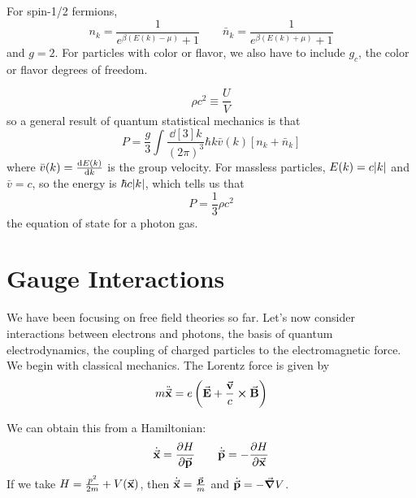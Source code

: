 \documentclass[a4paper,twoside,master.tex]{subfiles}
\begin{document}
For spin-1/2 fermions,
\begin{equation}
    n_k = \frac{1}{e^{\beta (E(k) - \mu)} + 1} \qquad \bar{n}_k = \frac{1}{e^{\beta (E(k) + \mu)} + 1}
\end{equation}
and $ g = 2 $. For particles with color or flavor, we also have to include $ g_c $, the color or flavor degrees of freedom.

\begin{equation}
    \rho c^2 \equiv \frac{U}{V}
\end{equation}
so a general result of quantum statistical mechanics is that
\begin{equation}
    P = \frac{g}{3} \int \frac{\dd[3]{k}}{(2 \pi)^3} \hbar k \bar{v}(k) [n_k + \bar{n}_k]
\end{equation}
where $ \bar{v}(k) = \dv{E(k)}{k} $ is the group velocity. For massless particles, $ E(k) = c \abs{k} $ and $ \bar{v} = c $, so the energy is $ \hbar c \abs{k} $, which tells us that
\begin{equation}
    P = \frac{1}{3} \rho c^2
\end{equation}
the equation of state for a photon gas.


\section{Gauge Interactions}\label{sec:gauge_interactions}

We have been focusing on free field theories so far. Let's now consider interactions between electrons and photons, the basis of quantum electrodynamics, the coupling of charged particles to the electromagnetic force. We begin with classical mechanics. The Lorentz force is given by
\begin{equation}
    m \ddot{\va{x}} = e \left( \va{E} + \frac{\va{v}}{c} \cross \va{B} \right)
\end{equation}

We can obtain this from a Hamiltonian:
\begin{equation}
    \dot{\va{x}} = \pdv{H}{\va{p}} \qquad \dot{\va{p}} = - \pdv{H}{\va{x}}
\end{equation}
If we take $ H = \frac{p^2}{2m} + V(\va{x}) $, then $ \dot{\va{x}} = \frac{\va{p}}{m} $ and $ \dot{\va{p}} = - \grad{V} $.
\end{document}
